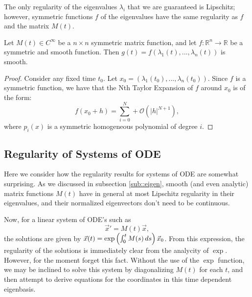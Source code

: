 The only regularity of the eigenvalues $\lambda_i$ that we are guaranteed is Lipschitz; however, symmetric functions $f$ of the eigenvalues have the same regularity as $f$ and the matrix $M(t)$.

 \begin{proposition}
 
Let $M(t) \in C^\infty$ be a $n\times n$ symmetric matrix function, and let $f: \mathbb R^n \to \mathbb R$ be a symmetric and smooth function. Then $g(t) = f(\lambda_1(t),..., \lambda_n(t))$ is smooth.

\end{proposition}

\begin{proof}

Consider any fixed time $t_0$. Let $x_0 = (\lambda_1(t_0), ..., \lambda_n(t_0)).$ Since $f$ is a symmetric function, we have that the Nth Taylor Expansion of $f$ around $x_0$ is of the form:
\begin{equation}
f(x_0 + h) = \sum\limits_{i=0}^N + \mathcal O( |h|^{N+1}),
\end{equation}
where $p_i(x)$ is a symmetric homogeneous polynomial of degree $i$. 

\end{proof}


\subsection{Regularity of Systems of ODE}
 
 Here we consider how the regularity results for systems of ODE are somewhat surprising. As we discussed in subsection \ref{sub::eigen}, smooth (and even analytic) matrix functions \(M(t)\) have in general at most Lipschitz regularity in their eigenvalues, and their normalized eigenvectors don't need to be continuous.
 
 Now, for a linear system of ODE's such as 
 \begin{equation}
 \vec x' = M(t) \vec x,
 \end{equation}
 the solutions are given by \(\vec x(t) = \exp\left( \int_0^t M(s) \, ds \right) \vec x_0\). From this expression, the regularity of the solutions is immediately clear from the analycity of \(\exp\). However, for the moment forget this fact. Without the use of the \(\exp\) function, we may be inclined to solve this system by diagonalizing \(M(t)\) for each \(t\), and then attempt to derive equations for the coordinates in this time dependent eigenbasis.

